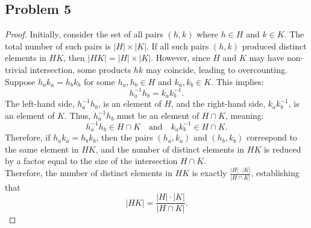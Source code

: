 \documentclass[12pt, letterpaper]{article}
\theoremstyle{definition}
\begin{document}
\newpage
\subsection*{Problem 5}

   \begin{proof}
     Initially, consider the set of all pairs \( (h, k) \) where \( h \in H \) and \( k \in K \). The total number of such pairs is \( |H| \times |K| \). If all such pairs \( (h, k) \) produced distinct elements in \( HK \), then \( |HK| = |H| \times |K| \). However, since \( H \) and \( K \) may have non-trivial intersection, some products \( hk \) may coincide, leading to overcounting.\\
     Suppose \( h_a k_a = h_b k_b \) for some \( h_a, h_b \in H \) and \( k_a, k_b \in K \). This implies:
     \[
     h_a^{-1} h_b = k_a k_b^{-1}.
     \]
     The left-hand side, \( h_a^{-1} h_b \), is an element of \( H \), and the right-hand side, \( k_a k_b^{-1} \), is an element of \( K \). Thus, \( h_a^{-1} h_b \) must be an element of \( H \cap K \), meaning:
     \[
     h_a^{-1} h_b \in H \cap K \quad \text{and} \quad k_a k_b^{-1} \in H \cap K.
     \]
     Therefore, if \( h_a k_a = h_b k_b \), then the pairs \( (h_a, k_a) \) and \( (h_b, k_b) \) correspond to the same element in \( HK \), and the number of distinct elements in \( HK \) is reduced by a factor equal to the size of the intersection \( H \cap K \).\\
     Therefore, the number of distinct elements in \( HK \) is exactly \( \frac{|H| \cdot |K|}{|H \cap K|} \), establishing that
     \[
     |HK| = \frac{|H| \cdot |K|}{|H \cap K|}.
     \]
   \end{proof}
\end{document}
